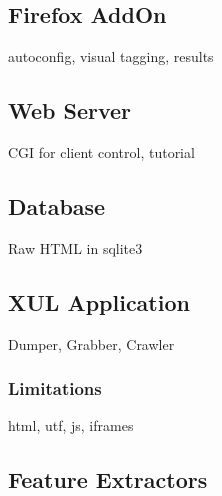 \subsection{Firefox AddOn}

autoconfig, visual tagging, results

\subsection{Web Server}

CGI for client control, tutorial

\subsection{Database}

Raw HTML in sqlite3

\subsection{XUL Application}

Dumper, Grabber, Crawler

%

\subsubsection{\label{sec:limitations}Limitations}

html, utf, js, iframes

\subsection{Feature Extractors}

